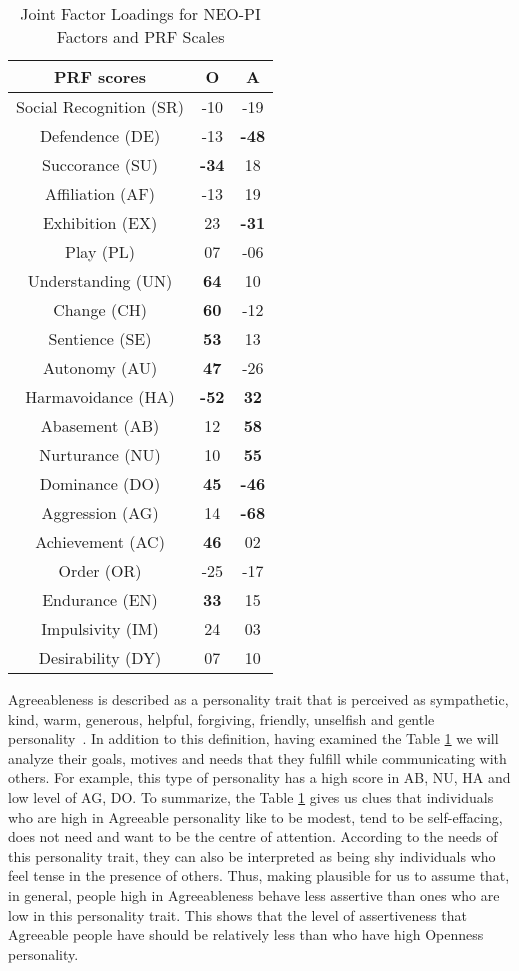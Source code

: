 \documentclass[12pt]{article}
\begin{document}
\begin{table} [h]
\caption{Joint Factor Loadings for NEO-PI Factors and PRF Scales}
\centering
\begin{tabular}{c c c} 
\\
 \hline \hline
PRF	scores				& \textbf{O} 	&\textbf{A}	\\ [0.5ex] 
 \hline
 Social Recognition (SR)		& -10 		& -19		\\ 
 Defendence (DE)			& -13		& \textbf{-48}	\\
 Succorance (SU)			& \textbf{-34}	& 18			\\
 Affiliation (AF)				& -13  		& 19			\\
 Exhibition (EX)				& 23			& \textbf{-31}	\\
 Play (PL)					& 07			& -06		\\
 Understanding (UN)			& \textbf{64}	& 10			\\
 Change (CH)				& \textbf{60}	& -12		\\
 Sentience (SE)				& \textbf{53}	& 13			\\
 Autonomy (AU)			& \textbf{47}	& -26		\\
 Harmavoidance (HA)		& \textbf{-52}	& \textbf{32}	\\
 Abasement (AB)			& 12			& \textbf{58}	\\
 Nurturance (NU)			& 10			& \textbf{55}	\\
 Dominance (DO)			& \textbf{45}	& \textbf{-46}	\\
 Aggression (AG)			& 14			& \textbf{-68}	\\
 Achievement (AC)			& \textbf{46}	& 02			\\
 Order (OR)				& -25		& -17		\\
 Endurance (EN)			& \textbf{33}	& 15			\\
 Impulsivity (IM)				& 24			& 03			\\
 Desirability (DY)			& 07			& 10			\\ [1ex] 
 \hline \hline		
 \end{tabular}
 \label{table:2}
 \end{table}
\par Agreeableness is described as a personality trait that is perceived as sympathetic, kind, warm, generous, helpful, forgiving, friendly, unselfish and gentle personality~\cite{matthews2003personality}.
In addition to this definition, having examined the Table \ref{table:2} we will analyze their goals, motives and needs that they fulfill while communicating with others. 
For example, this type of personality has a high score in AB, NU, HA and low level of AG, DO. To summarize, the Table \ref{table:2} gives us clues that individuals who are high in Agreeable personality like to be modest, tend to be self-effacing, does not need and want to be the centre of attention. According to the needs of this personality trait, they can also be interpreted as being shy individuals who feel tense in the presence of others. Thus, making plausible for us to assume that, in general, people high in Agreeableness behave less assertive than ones who are low in this personality trait. This shows that the level of assertiveness that Agreeable people have should be relatively less than who have high Openness personality.
\end{document}
